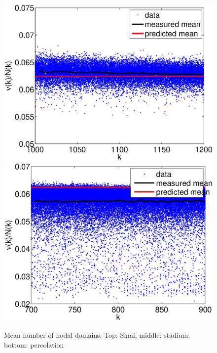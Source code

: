 \documentclass{report}
\begin{document}
\begin{figure}
  \begin{center}
    \includegraphics[width=\textwidth]{figs/results/qugrs_1000_to_1200_mean.eps}
    \includegraphics[width=\textwidth]{figs/results/qust_700_to_900_mean.eps}

    \caption{Mean number of nodal domains. Top: Sinai; middle: stadium; bottom: percolation}
    \label{fig:mean}
  \end{center}
\end{figure}
\end{document}
